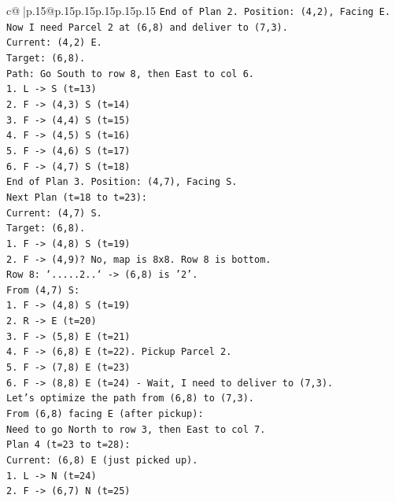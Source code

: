 \documentclass{article}
\begin{document}
{\begin{supertabular}{c@{$\;$}|p{.15\linewidth}@{}p{.15\linewidth}p{.15\linewidth}p{.15\linewidth}p{.15\linewidth}p{.15\linewidth}}
{{{\texttt{End of Plan 2. Position: (4,2), Facing E.} \\
\texttt{Now I need Parcel 2 at (6,8) and deliver to (7,3).} \\
\texttt{Current: (4,2) E.} \\
\texttt{Target: (6,8).} \\
\texttt{Path: Go South to row 8, then East to col 6.} \\
\texttt{1. L {-}> S (t=13)} \\
\texttt{2. F {-}> (4,3) S (t=14)} \\
\texttt{3. F {-}> (4,4) S (t=15)} \\
\texttt{4. F {-}> (4,5) S (t=16)} \\
\texttt{5. F {-}> (4,6) S (t=17)} \\
\texttt{6. F {-}> (4,7) S (t=18)} \\
\texttt{End of Plan 3. Position: (4,7), Facing S.} \\
\texttt{Next Plan (t=18 to t=23):} \\
\texttt{Current: (4,7) S.} \\
\texttt{Target: (6,8).} \\
\texttt{1. F {-}> (4,8) S (t=19)} \\
\texttt{2. F {-}> (4,9)? No, map is 8x8. Row 8 is bottom.} \\
\texttt{Row 8: `.....2..` {-}> (6,8) is '2'.} \\
\texttt{From (4,7) S:} \\
\texttt{1. F {-}> (4,8) S (t=19)} \\
\texttt{2. R {-}> E (t=20)} \\
\texttt{3. F {-}> (5,8) E (t=21)} \\
\texttt{4. F {-}> (6,8) E (t=22). Pickup Parcel 2.} \\
\texttt{5. F {-}> (7,8) E (t=23)} \\
\texttt{6. F {-}> (8,8) E (t=24) {-} Wait, I need to deliver to (7,3).} \\
\texttt{Let's optimize the path from (6,8) to (7,3).} \\
\texttt{From (6,8) facing E (after pickup):} \\
\texttt{Need to go North to row 3, then East to col 7.} \\
\texttt{Plan 4 (t=23 to t=28):} \\
\texttt{Current: (6,8) E (just picked up).} \\
\texttt{1. L {-}> N (t=24)} \\
\texttt{2. F {-}> (6,7) N (t=25)} \\
}}}
\end{supertabular}}
\end{document}
